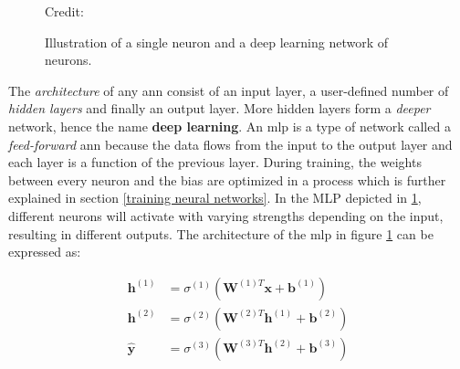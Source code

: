             \begin{figure}[H]
                \centering
                
        	
                
                \caption[The perceptron and multi-layer perceptron]{Illustration of a single neuron and a deep learning network of neurons.}
              	\medskip 
                \hspace*{15pt}\hbox{\scriptsize Credit: \citeauthor{razavi2021deep_exp_DL}\cite{razavi2021deep_exp_DL}}
                \label{Perceptron / MLP}
            \end{figure}
        
        The \textit{architecture} of any \gls{ann} consist of an input layer, a user-defined number of \textit{hidden layers} and finally an output layer\cite{razavi2021deep_exp_per}. More hidden layers form a \textit{deeper} network, hence the name \textbf{deep learning}. An \gls{mlp} is a type of network called a \textit{feed-forward} \gls{ann} because the data flows from the input to the output layer and each layer is a function of the previous layer. During training, the weights between every neuron and the bias are optimized in a process which is further explained in section \ref{training neural networks}. In the MLP depicted in \ref{Perceptron / MLP}, different neurons will activate with varying strengths depending on the input, resulting in different outputs. The architecture of the \gls{mlp} in figure \ref{Perceptron / MLP} can be expressed as\cite{Goodfellow-et-al-2016_architecture}:
        
        \begin{align}\label{mlp outputlayer eq}
            \textbf{h}^{(1)} &= \sigma^{(1)}(\textbf{W}^{(1)T}\textbf{x} + \textbf{b}^{(1)})\\
            \textbf{h}^{(2)} &= \sigma^{(2)}(\textbf{W}^{(2)T}\textbf{h}^{(1)} + \textbf{b}^{(2)})\\
            \hat{\textbf{y}} &= \sigma^{(3)}(\textbf{W}^{(3)T}\textbf{h}^{(2)} + \textbf{b}^{(3)})
        \end{align}

